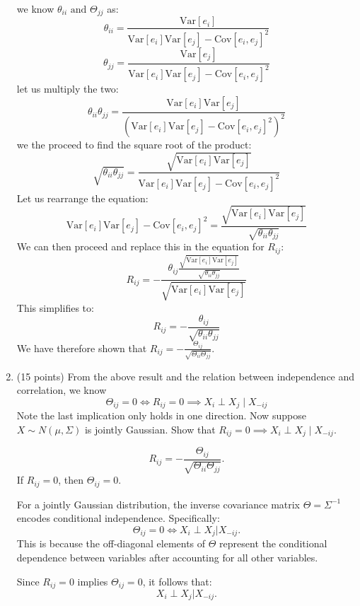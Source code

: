 \documentclass[a3paper,12pt]{extarticle} %
\begin{document}
\begin{enumerate}
\[    \]
    we know \(\theta_{ii} \text{ and } \Theta_{jj}\) as:
    \[
        \theta_{ii} = \frac{\text{Var}[e_i]}{\text{Var}[e_i] \text{Var}[e_j] - \text{Cov}[e_i, e_j]^2}
    \]
    \[
        \theta_{jj} = \frac{\text{Var}[e_j]}{\text{Var}[e_i] \text{Var}[e_j] - \text{Cov}[e_i, e_j]^2}
    \]
    let us multiply the two:
    \[
    \theta_{ii} \theta_{jj} = \frac{\text{Var}[e_i] \text{Var}[e_j]}{(\text{Var}[e_i] \text{Var}[e_j] - \text{Cov}[e_i, e_j]^2)^2}
    \]
    we the proceed to find the square root of the product:
    \[
    \sqrt{\theta_{ii} \theta_{jj}} = \frac{\sqrt{\text{Var}[e_i] \text{Var}[e_j]}}{\text{Var}[e_i] \text{Var}[e_j] - \text{Cov}[e_i, e_j]^2}
    \]
    Let us rearrange the equation:
    \[
        \text{Var}[e_i] \text{Var}[e_j] - \text{Cov}[e_i, e_j]^2 = \frac{\sqrt{\text{Var}[e_i] \text{Var}[e_j]}}{\sqrt{\theta_{ii} \theta_{jj}}}
    \]
    We can then proceed and replace this in the equation for \(R_{ij}\):
    \[
    R_{ij} = -\frac{\theta_{ij} \frac{\sqrt{\text{Var}[e_i] \text{Var}[e_j]}}{\sqrt{\theta_{ii} \theta_{jj}}}}{\sqrt{\text{Var}[e_i] \text{Var}[e_j]}}
    \]
    This simplifies to:
    \[
    R_{ij} = -\frac{\theta_{ij}}{\sqrt{\theta_{ii} \theta_{jj}}}
    \]
    We have therefore shown that \( R_{ij} = -\frac{\Theta_{ij}}{\sqrt{\Theta_{ii} \Theta_{jj}}} \).
    
    \item (15 points) From the above result and the relation between independence and correlation, we know
    \[
    \Theta_{ij} = 0 \iff R_{ij} = 0 \implies X_i \perp X_j \mid X_{-ij}
    \]
    Note the last implication only holds in one direction. Now suppose \(X \sim N(\mu, \Sigma)\) is jointly Gaussian. Show that \(R_{ij} = 0 \implies X_i \perp X_j \mid X_{-ij}\).

\[
R_{ij} = -\frac{\Theta_{ij}}{\sqrt{\Theta_{ii} \Theta_{jj}}}.
\]
If \( R_{ij} = 0 \), then \( \Theta_{ij} = 0 \).

For a jointly Gaussian distribution, the inverse covariance matrix \( \Theta = \Sigma^{-1} \) encodes conditional independence. Specifically:
\[
\Theta_{ij} = 0 \iff X_i \perp X_j | X_{-ij}.
\]
This is because the off-diagonal elements of \( \Theta \) represent the conditional dependence between variables after accounting for all other variables.

Since \( R_{ij} = 0 \) implies \( \Theta_{ij} = 0 \), it follows that:
\[
X_i \perp X_j | X_{-ij}.
\]

\end{enumerate}
\newpage
\end{document}
